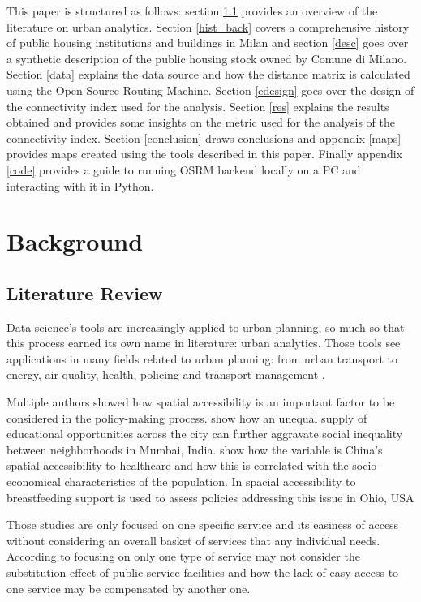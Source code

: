 \documentclass[12pt]{article}
\begin{document}
This paper is structured as follows: section \ref{lirev} provides an overview of the literature on urban analytics. Section \ref{hist_back} covers a comprehensive history of public housing institutions and buildings in Milan and section \ref{desc} goes over a synthetic description of the public housing stock owned by Comune di Milano. Section \ref{data} explains the data source and how the distance matrix is calculated using the Open Source Routing Machine. Section \ref{edesign} goes over the design of the connectivity index used for the analysis. Section \ref{res} explains the results obtained and provides some insights on the metric used for the analysis of the connectivity index. Section \ref{conclusion} draws conclusions and appendix \ref{maps} provides maps created using the tools described in this paper. Finally appendix \ref{code} provides a guide to running OSRM backend locally on a PC and interacting with it in Python.

\section{Background}
\label{back}

\subsection{Literature Review}
\label{lirev}

Data science's tools are increasingly applied to urban planning, so much so that this process earned its own name in literature: urban analytics. Those tools see applications in many fields related to urban planning: from urban transport to energy, air quality, health, policing and transport management \parencite{Kandt2021}. 

Multiple authors showed how spatial accessibility is an important factor to be considered in the policy-making process. \cite{Sharma2022} show how an unequal supply of educational opportunities across the city can further aggravate social inequality between neighborhoods in Mumbai, India. \cite{Yin2018} show how the variable is China's spatial accessibility to healthcare and how this is correlated with the socio-economical characteristics of the population. In \cite{Grubesic2017} spacial accessibility to breastfeeding support is used to assess policies addressing this issue in Ohio, USA

Those studies are only focused on one specific service and its easiness of access without considering an overall basket of services that any individual needs. According to \cite{wang2005assessing}
focusing on only one type of service may not consider the substitution effect of public service facilities and how the lack of easy access to one service may be compensated by another one.
\end{document}
